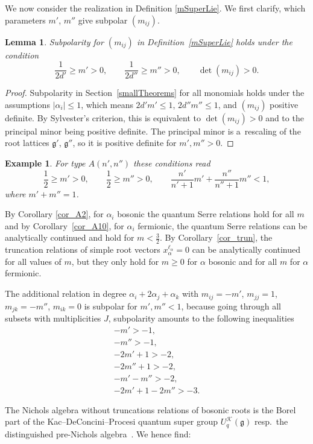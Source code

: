 \documentclass[pdftex]{sigma}%
\numberwithin{equation}{section}
\newtheorem{lem}[teo]{Lemma}
\newtheorem{ese}[teo]{Example}
\newcommand{\g}{\mathfrak{g}}
\begin{document}
 We now consider the realization in Definition \ref{mSuperLie}. We first clarify, which parameters $m'$, $m''$ give subpolar $(m_{ij})$.
 \begin{lem}
 	Subpolarity for $(m_{ij})$ in Definition~{\rm \ref{mSuperLie}} holds under the condition
 \[\frac{1}{2d'}\geq m'>0,\qquad \frac{1}{2d''}\geq m''>0,\qquad \det (m_{ij})>0.\]
 \end{lem}
 \begin{proof}
 	Subpolarity in Section~\ref{smallTheorems} for all monomials holds under the assumptions $|\alpha_i|\leq 1$, which means $2d'm'\leq 1$, $2d''m''\leq 1$, and $(m_{ij})$ positive definite. By Sylvester's criterion, this is equivalent to $\det (m_{ij})>0$ and to the principal minor being positive definite. The principal minor is a~rescaling of the root lattices $\g'$, $\g''$, so it is positive definite for $m',m''>0$.
 \end{proof}

 \begin{ese}For type $A(n',n'')$ these conditions read
 \[\frac{1}{2}\geq m'>0,\qquad \frac{1}{2}\geq m''>0,\qquad \frac{n'}{n'+1}m'+\frac{n''}{n''+1}m''<1,\]
 where $m'+m''=1$.
 \end{ese}

By Corollary \ref{cor_A2}, for $\alpha_i$ bosonic the quantum Serre relations hold for all $m$ and by Corollary~\ref{cor_A10}, for $\alpha_i$ fermionic, the quantum Serre relations can be analytically continued and hold for $m<\frac{3}{2}$. By Corollary~\ref{cor_trun}, the truncation relations of simple root vectors $x_\alpha^{\ell_\alpha}=0$ can be analytically continued for all values of $m$, but they only hold for $m\geq 0$ for $\alpha$ bosonic and for all $m$ for $\alpha$ fermionic.

 The additional relation in degree $\alpha_i+2\alpha_j+\alpha_k$ with $m_{ij}=-m'$, $m_{jj}=1$, $m_{jk}=-m''$, $m_{ik}=0$ is subpolar for $m',m''<1$, because going through all subsets with multiplicities $J$, subpolarity amounts to the following inequalities
 \begin{gather*}
 -m'>-1,\\
 -m''>-1,\\
 -2m'+1>-2,\\
 -2m''+1>-2,\\
 -m'-m''>-2,\\
 -2m'+1-2m''>-3.
 \end{gather*}

The Nichols algebra without truncations relations of bosonic roots is the Borel part of the Kac--DeConcini--Procesi quantum super group $U_q^\mathcal{K}(\g)$ resp.~the distinguished pre-Nichols algebra~\cite{Ang16}. We hence find:
\end{document}
